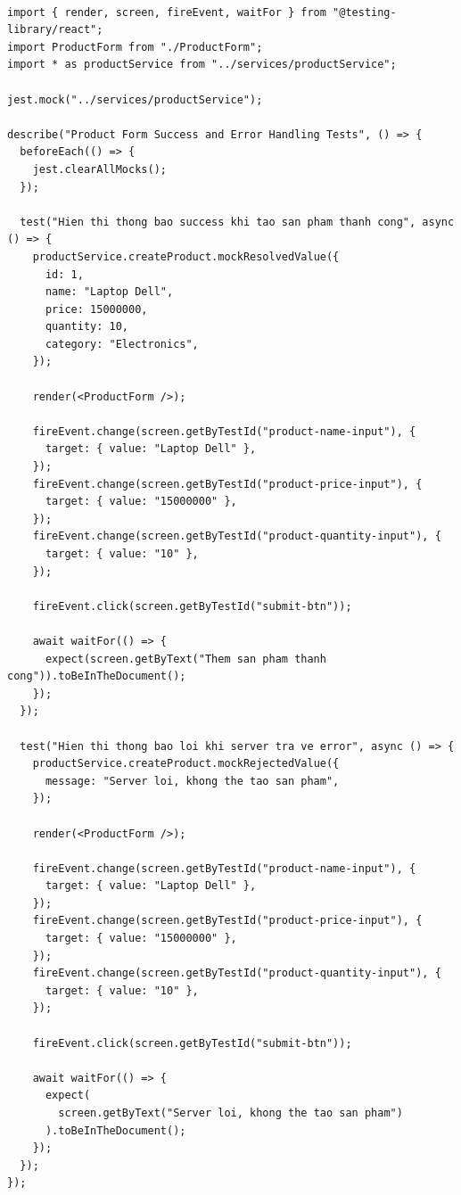 \documentclass[a4paper,12pt]{article}
\begin{document}
\begin{tcolorbox}[breakable, colback=green!5,colframe=black!50,title=Product Form Success and Error Handling Tests]
\begin{lstlisting}

import { render, screen, fireEvent, waitFor } from "@testing-library/react";
import ProductForm from "./ProductForm";
import * as productService from "../services/productService";

jest.mock("../services/productService");

describe("Product Form Success and Error Handling Tests", () => {
  beforeEach(() => {
    jest.clearAllMocks();
  });

  test("Hien thi thong bao success khi tao san pham thanh cong", async () => {
    productService.createProduct.mockResolvedValue({
      id: 1,
      name: "Laptop Dell",
      price: 15000000,
      quantity: 10,
      category: "Electronics",
    });

    render(<ProductForm />);

    fireEvent.change(screen.getByTestId("product-name-input"), {
      target: { value: "Laptop Dell" },
    });
    fireEvent.change(screen.getByTestId("product-price-input"), {
      target: { value: "15000000" },
    });
    fireEvent.change(screen.getByTestId("product-quantity-input"), {
      target: { value: "10" },
    });

    fireEvent.click(screen.getByTestId("submit-btn"));

    await waitFor(() => {
      expect(screen.getByText("Them san pham thanh cong")).toBeInTheDocument();
    });
  });

  test("Hien thi thong bao loi khi server tra ve error", async () => {
    productService.createProduct.mockRejectedValue({
      message: "Server loi, khong the tao san pham",
    });

    render(<ProductForm />);

    fireEvent.change(screen.getByTestId("product-name-input"), {
      target: { value: "Laptop Dell" },
    });
    fireEvent.change(screen.getByTestId("product-price-input"), {
      target: { value: "15000000" },
    });
    fireEvent.change(screen.getByTestId("product-quantity-input"), {
      target: { value: "10" },
    });

    fireEvent.click(screen.getByTestId("submit-btn"));

    await waitFor(() => {
      expect(
        screen.getByText("Server loi, khong the tao san pham")
      ).toBeInTheDocument();
    });
  });
});
\end{lstlisting}
\end{tcolorbox}
\end{document}
